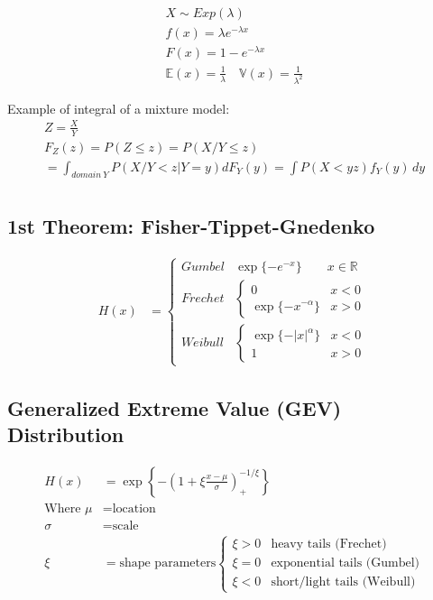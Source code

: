\documentclass[
  oneside]{book}
\begin{document}
\[
\begin{gathered}
X \sim Exp(\lambda)\\
f(x) = \lambda e^{{-\lambda x}}\\
F(x) = {\displaystyle 1-e^{-\lambda x}}\\
\mathbb{E}(x) = \frac{1}{\lambda} \quad \mathbb{V}(x) = \frac{1}{\lambda^{2}}
\end{gathered}
\]

Example of integral of a mixture model:
\[
\begin{gathered}
Z = \frac{X}{Y}\\
F_{Z}(z) = P(Z\leq z) = P(X/Y \leq z)\\
= \int_{domain \ Y} P(X/Y < z|Y = y) dF_{Y}(y)
= \int P(X < yz) f_{Y}(y) \, dy\\
\end{gathered}
\]

\hypertarget{st-theorem-fisher-tippet-gnedenko-1}{%
\subsection{1st Theorem: Fisher-Tippet-Gnedenko}\label{st-theorem-fisher-tippet-gnedenko-1}}

\[
\begin{aligned}
H(x) &= \begin{cases}
Gumbel & \exp\{-e^{-x}\} \quad\quad x \in \mathbb{R}\\
Frechet & \begin{cases}
0 & x < 0 \\
\exp\{-x^{-\alpha}\}  & x >0
\end{cases}\\
Weibull  & \begin{cases}
\exp\{-|x|^{\alpha}\}  & x<0 \\
1 & x > 0
\end{cases}
\end{cases}
\end{aligned}
\]

\hypertarget{generalized-extreme-value-gev-distribution-1}{%
\subsection{Generalized Extreme Value (GEV) Distribution}\label{generalized-extreme-value-gev-distribution-1}}

\[
\begin{aligned}
H(x) &= \exp\left\{ -\left( 1+\xi\frac{x-\mu}{\sigma} \right)^{-1/\xi}_{+} \right\}\\
\text{Where } \mu &= \text{location}\\
\sigma &= \text{scale}\\
\xi &= \text{shape parameters} \begin{cases}
\xi>0 & \text{heavy tails (Frechet)} \\
\xi=0 & \text{exponential tails (Gumbel)} \\
\xi < 0  & \text{short/light tails (Weibull)}
\end{cases}
\end{aligned}
\]
\end{document}
